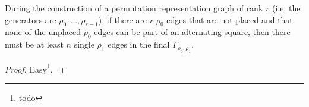\begin{lemma}
  \label{rho0atEnd}
  During the construction of a permutation representation graph of rank $r$ (i.e. the generators are $\rho_0, \dots, \rho_{r-1}$), if there are $r$ $\rho_0$ edges that are not placed and that none of the unplaced $\rho_0$ edges can be part of an alternating square, then there must be at least $n$ single $\rho_1$ edges in the final $\Gamma_{\rho_0, \rho_1}$.
\end{lemma}

\begin{proof}
  Easy\footnote{todo}.
\end{proof}
